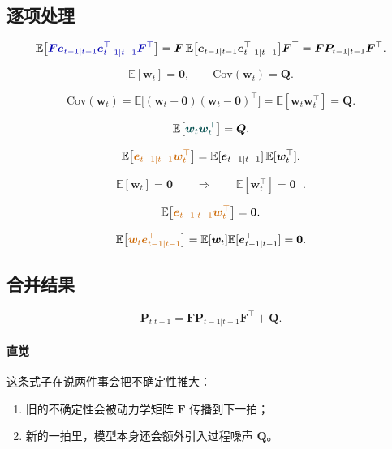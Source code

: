 \subsection{逐项处理}


\[
\mathbb{E}\big[\eqfocusa{\bm{F}\bm{e}_{t-1|t-1}\bm{e}_{t-1|t-1}^\top\bm{F}^\top}\big]
= \bm{F}\,\mathbb{E}\big[\bm{e}_{t-1|t-1}\bm{e}_{t-1|t-1}^\top\big]\bm{F}^\top
= \bm{F}\bm{P}_{t-1|t-1}\bm{F}^\top.
\]


\[
\mathbb{E}[\bm{w}_t] = \bm{0},
\qquad
\mathrm{Cov}(\bm{w}_t) = \bm{Q}.
\]


\[
\mathrm{Cov}(\bm{w}_t)
= \mathbb{E}\big[(\bm{w}_t-\bm{0})(\bm{w}_t-\bm{0})^\top\big]
= \mathbb{E}[\bm{w}_t\bm{w}_t^\top]
= \bm{Q}.
\]

\[
\mathbb{E}\big[\eqfocusb{\bm{w}_t\bm{w}_t^\top}\big] = \bm{Q}.
\]


\[
\mathbb{E}\big[\eqfocusc{\bm{e}_{t-1|t-1}\bm{w}_t^\top}\big]
= \mathbb{E}[\bm{e}_{t-1|t-1}]\,\mathbb{E}[\bm{w}_t^\top].
\]


\[
\mathbb{E}[\bm{w}_t] = \bm{0}
\qquad\Longrightarrow\qquad
\mathbb{E}[\bm{w}_t^\top] = \bm{0}^\top.
\]


\[
\mathbb{E}\big[\eqfocusc{\bm{e}_{t-1|t-1}\bm{w}_t^\top}\big] = \bm{0}.
\]


\[
\mathbb{E}\big[\eqfocusc{\bm{w}_t\bm{e}_{t-1|t-1}^\top}\big]
= \mathbb{E}[\bm{w}_t]\mathbb{E}[\bm{e}_{t-1|t-1}^\top]
= \bm{0}.
\]

\subsection{合并结果}


\[
\bm{P}_{t|t-1}
= \bm{F}\bm{P}_{t-1|t-1}\bm{F}^\top + \bm{Q}.
\]

\paragraph{直觉}
这条式子在说两件事会把不确定性推大：
\begin{enumerate}
  \item 旧的不确定性会被动力学矩阵
  \(\bm{F}\)
  传播到下一拍；
  \item 新的一拍里，模型本身还会额外引入过程噪声
  \(\bm{Q}\)。
\end{enumerate}
